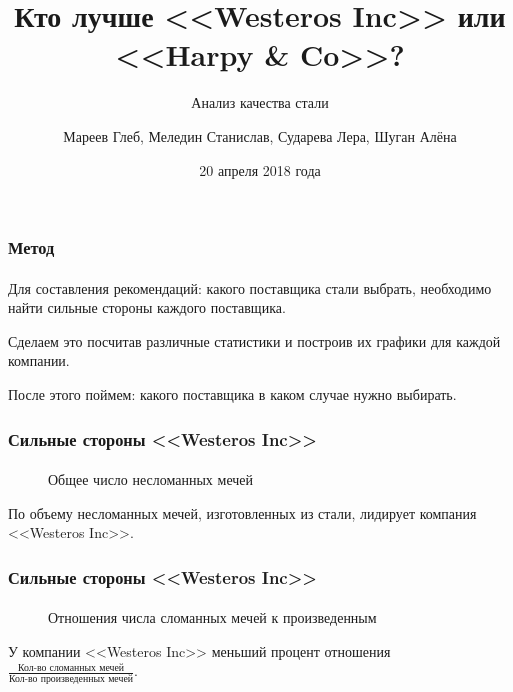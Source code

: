 \documentclass[10pt,pdf,hyperref={unicode}]{beamer}
\title{Кто лучше <<Westeros Inc>> или <<Harpy \& Co>>?}
\subtitle{Анализ качества стали}
\author{
Мареев Глеб, Меледин Станислав, Сударева Лера, Шуган Алёна}
\date{20 апреля 2018 года}
\begin{document}
\begin{frame}
\titlepage
\end{frame} 

\begin{frame}
\frametitle{Метод} 
\framesubtitle{}
Для составления рекомендаций: какого поставщика стали выбрать, необходимо найти сильные стороны каждого поставщика. 

Сделаем это посчитав различные статистики и построив их графики для каждой компании.

После этого поймем: какого поставщика в каком случае нужно выбирать.
\end{frame}


\begin{frame}
\frametitle{Сильные стороны <<Westeros Inc>>} 
\framesubtitle{}

\begin{minipage}{0.4\textwidth}
 	\begin{figure}[L]
		\caption{Общее число несломанных мечей}	
	\end{figure}
\end{minipage}
\hfill
\begin{minipage}{0.4\textwidth}
	По объему несломанных мечей, изготовленных из стали, лидирует компания <<Westeros Inc>>.
\end{minipage}
\end{frame}

\begin{frame}
\frametitle{Сильные стороны <<Westeros Inc>>} 
\framesubtitle{}

\begin{minipage}{0.4\textwidth}
 	\begin{figure}[L]
		\caption{Отношения числа сломанных мечей к произведенным}		
	\end{figure}
\end{minipage}
\hfill
\begin{minipage}{0.4\textwidth}
	У компании <<Westeros Inc>> меньший процент отношения $\frac{\text{Кол-во сломанных мечей}}{\text{Кол-во произведенных мечей}}$.
\end{minipage}
\end{frame}
\end{document}
